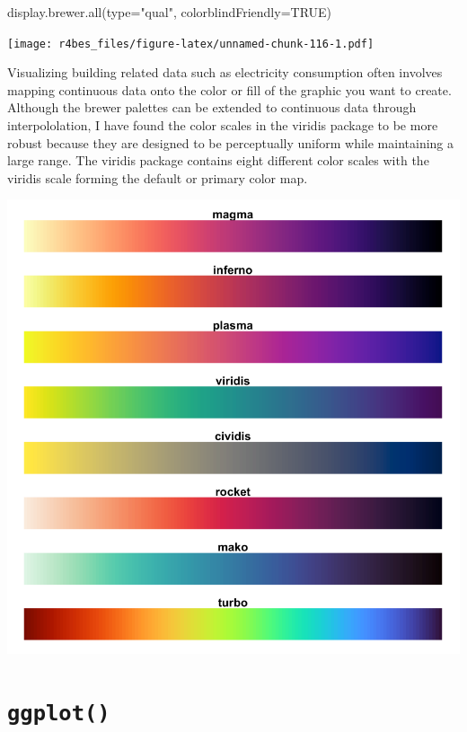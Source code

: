 \documentclass[
]{book}
\newenvironment{Shaded}{\begin{snugshade}}{\end{snugshade}}
\newcommand{\AttributeTok}[1]{\textcolor[rgb]{0.77,0.63,0.00}{#1}}
\newcommand{\ConstantTok}[1]{\textcolor[rgb]{0.00,0.00,0.00}{#1}}
\newcommand{\FunctionTok}[1]{\textcolor[rgb]{0.00,0.00,0.00}{#1}}
\newcommand{\NormalTok}[1]{#1}
\newcommand{\StringTok}[1]{\textcolor[rgb]{0.31,0.60,0.02}{#1}}
\begin{document}
\begin{Shaded}
\begin{Highlighting}[]
\FunctionTok{display.brewer.all}\NormalTok{(}\AttributeTok{type=}\StringTok{"qual"}\NormalTok{, }\AttributeTok{colorblindFriendly=}\ConstantTok{TRUE}\NormalTok{) }
\end{Highlighting}
\end{Shaded}

\texttt{[image: r4bes\_files/figure-latex/unnamed-chunk-116-1.pdf]}

Visualizing building related data such as electricity consumption often involves mapping continuous data onto the color or fill of the graphic you want to create. Although the brewer palettes can be extended to continuous data through interpololation, I have found the color scales in the viridis package to be more robust because they are designed to be perceptually uniform while maintaining a large range. The viridis package contains eight different color scales with the viridis scale forming the default or primary color map.

\begin{center}\includegraphics[width=12.61in,height=0.7\textheight]{figures/viridis} \end{center}

\hypertarget{ggplot}{%
\section{\texorpdfstring{\texttt{ggplot()}}{ggplot()}}\label{ggplot}}
\end{document}
